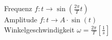 Frequenz $f: t \rightarrow \sin(\frac{2 \pi}{T} t)$\\
Amplitude $f: t \rightarrow A \cdot \sin(t)$\\
Winkelgeschwindigkeit $\omega = \frac{2 \pi}{T} \left[\frac{1}{s}\right]$